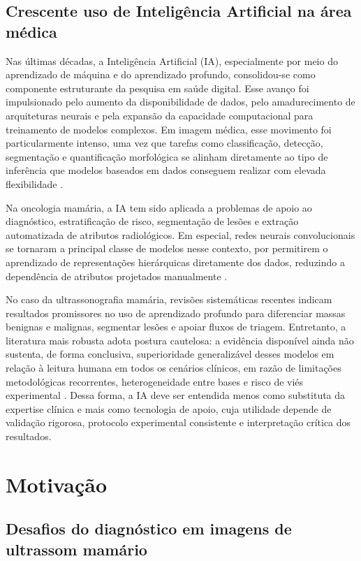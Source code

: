\documentclass[tcc,capa]{texufpel}
\begin{document}
\subsection{Crescente uso de Inteligência Artificial na área médica}

Nas últimas décadas, a Inteligência Artificial (IA), especialmente por meio do aprendizado de máquina e do aprendizado profundo, consolidou-se como componente estruturante da pesquisa em saúde digital. Esse avanço foi impulsionado pelo aumento da disponibilidade de dados, pelo amadurecimento de arquiteturas neurais e pela expansão da capacidade computacional para treinamento de modelos complexos. Em imagem médica, esse movimento foi particularmente intenso, uma vez que tarefas como classificação, detecção, segmentação e quantificação morfológica se alinham diretamente ao tipo de inferência que modelos baseados em dados conseguem realizar com elevada flexibilidade \cite{Barragan2021,Alhejaily2024,Zhou2021}.

Na oncologia mamária, a IA tem sido aplicada a problemas de apoio ao diagnóstico, estratificação de risco, segmentação de lesões e extração automatizada de atributos radiológicos. Em especial, redes neurais convolucionais se tornaram a principal classe de modelos nesse contexto, por permitirem o aprendizado de representações hierárquicas diretamente dos dados, reduzindo a dependência de atributos projetados manualmente \cite{Barragan2021,Zhou2021}.

No caso da ultrassonografia mamária, revisões sistemáticas recentes indicam resultados promissores no uso de aprendizado profundo para diferenciar massas benignas e malignas, segmentar lesões e apoiar fluxos de triagem. Entretanto, a literatura mais robusta adota postura cautelosa: a evidência disponível ainda não sustenta, de forma conclusiva, superioridade generalizável desses modelos em relação à leitura humana em todos os cenários clínicos, em razão de limitações metodológicas recorrentes, heterogeneidade entre bases e risco de viés experimental \cite{Dan2024,Liu2025}. Dessa forma, a IA deve ser entendida menos como substituta da expertise clínica e mais como tecnologia de apoio, cuja utilidade depende de validação rigorosa, protocolo experimental consistente e interpretação crítica dos resultados.

\section{Motivação}

\subsection{Desafios do diagnóstico em imagens de ultrassom mamário}
\end{document}
